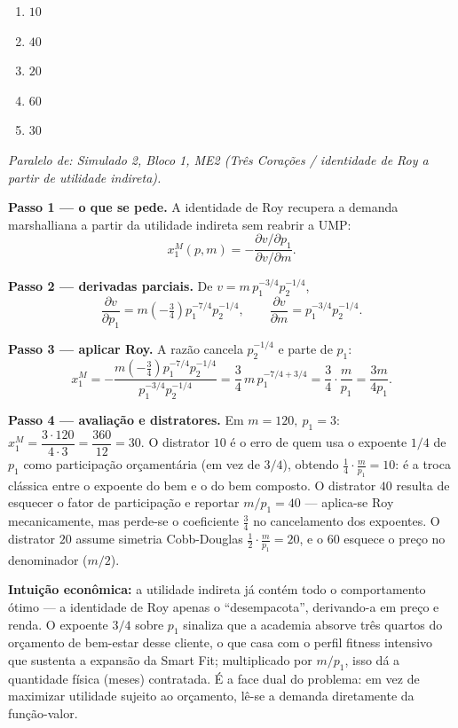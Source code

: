 \begin{enumerate}[label=\Alph*., leftmargin=3.2em, itemsep=0.15em, topsep=0.2em]
  \item $10$
  \item $40$
  \item $20$
  \item $60$
  \item $30$
\end{enumerate}
\begin{solucao}
{\footnotesize\textit{Paralelo de: Simulado 2, Bloco 1, ME2 (Três Corações / identidade de Roy a partir de utilidade indireta).}}\par\vspace{0.2em}
\textbf{Passo 1 --- o que se pede.} A identidade de Roy recupera a demanda marshalliana a partir da utilidade indireta sem reabrir a UMP:
\[
x_1^{M}(p,m)=-\frac{\partial v/\partial p_1}{\partial v/\partial m}.
\]

\textbf{Passo 2 --- derivadas parciais.} De $v=m\,p_1^{-3/4}p_2^{-1/4}$,
\[
\frac{\partial v}{\partial p_1}=m\left(-\tfrac34\right)p_1^{-7/4}p_2^{-1/4},\qquad \frac{\partial v}{\partial m}=p_1^{-3/4}p_2^{-1/4}.
\]

\textbf{Passo 3 --- aplicar Roy.} A razão cancela $p_2^{-1/4}$ e parte de $p_1$:
\[
x_1^{M}=-\frac{m\left(-\tfrac34\right)p_1^{-7/4}p_2^{-1/4}}{p_1^{-3/4}p_2^{-1/4}}=\frac34\,m\,p_1^{-7/4+3/4}=\frac34\cdot\frac{m}{p_1}=\frac{3m}{4p_1}.
\]

\textbf{Passo 4 --- avaliação e distratores.} Em $m=120,\ p_1=3$: $x_1^{M}=\dfrac{3\cdot 120}{4\cdot 3}=\dfrac{360}{12}=30$. O distrator $10$ é o erro de quem usa o expoente $1/4$ de $p_1$ como participação orçamentária (em vez de $3/4$), obtendo $\tfrac14\cdot\tfrac{m}{p_1}=10$: é a troca clássica entre o expoente do bem e o do bem composto. O distrator $40$ resulta de esquecer o fator de participação e reportar $m/p_1=40$ --- aplica-se Roy mecanicamente, mas perde-se o coeficiente $\tfrac34$ no cancelamento dos expoentes. O distrator $20$ assume simetria Cobb-Douglas $\tfrac12\cdot\tfrac{m}{p_1}=20$, e o $60$ esquece o preço no denominador ($m/2$).

\textbf{Intuição econômica:} a utilidade indireta já contém todo o comportamento ótimo --- a identidade de Roy apenas o ``desempacota'', derivando-a em preço e renda. O expoente $3/4$ sobre $p_1$ sinaliza que a academia absorve três quartos do orçamento de bem-estar desse cliente, o que casa com o perfil fitness intensivo que sustenta a expansão da Smart Fit; multiplicado por $m/p_1$, isso dá a quantidade física (meses) contratada. É a face dual do problema: em vez de maximizar utilidade sujeito ao orçamento, lê-se a demanda diretamente da função-valor.
\end{solucao}

